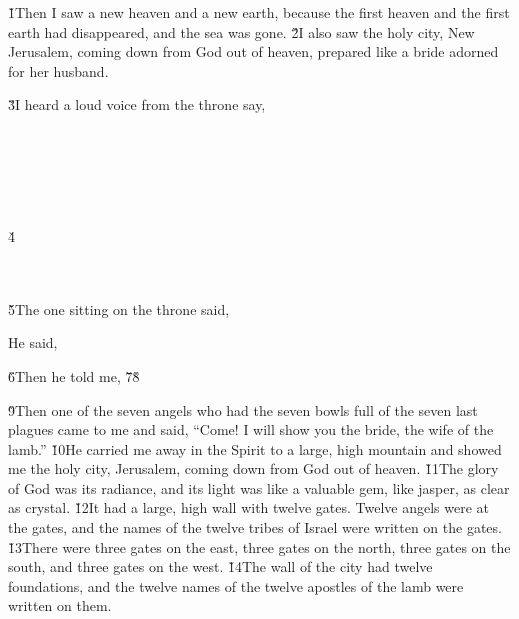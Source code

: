 \v{1}Then I saw a new heaven and a new earth, because the first heaven and the first earth had disappeared, and the sea was gone. \v{2}I also saw the holy city, New Jerusalem, coming down from God out of heaven, prepared like a bride adorned for her husband.

\v{3}I heard a loud voice from the throne say,

\begin{poetry}
\poeml {} \\
\poemll    {} \\
\poemlll       {} \\
\poeml {} \\
\poemll    {} \\
\poeml \v{4} \\
\poemll    {} \\
\poeml {} \\
\poemll    {}
\end{poetry}

\v{5}The one sitting on the throne said, 

He said, 

\v{6}Then he told me, \v{7}\v{8}

\v{9}Then one of the seven angels who had the seven bowls full of the seven last plagues came to me and said, ``Come! I will show you the bride, the wife of the lamb.'' \v{10}He carried me away in the Spirit to a large, high mountain and showed me the holy city, Jerusalem, coming down from God out of heaven. \v{11}The glory of God was its radiance, and its light was like a valuable gem, like jasper, as clear as crystal. \v{12}It had a large, high wall with twelve gates. Twelve angels were at the gates, and the names of the twelve tribes of Israel were written on the gates. \v{13}There were three gates on the east, three gates on the north, three gates on the south, and three gates on the west. \v{14}The wall of the city had twelve foundations, and the twelve names of the twelve apostles of the lamb were written on them.

